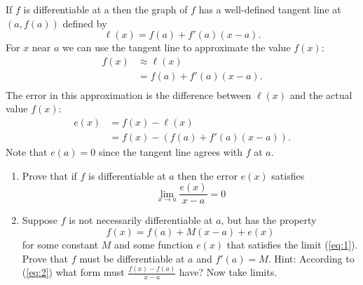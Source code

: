 \documentclass[12pt,letterpaper]{hmcpset}
\begin{document}
\begin{solution}
\end{solution}
\pagebreak
\begin{problem}[5]
  If $f$ is differentiable at a then the graph of $f$ has a well-defined tangent line at $(a,f(a))$ defined by
  \[ \ell(x) = f(a) + f'(a)(x-a).\]
  For $x$ near $a$ we can use the tangent line to approximate the value $f(x)$:
  \begin{align*}
    f(x) &\approx \ell(x) \\
         &= f(a) + f'(a)(x-a).\\
  \end{align*}
  The error in this approximation is the difference between $\ell(x)$ and the actual value $f(x)$:
  \begin{align*}
    e(x) &= f(x) - \ell(x) \\
         &= f(x) - (f(a) + f'(a)(x-a)).
  \end{align*}
  Note that $e(a) = 0$ since the tangent line agrees with $f$ at $a$.
  \begin{enumerate}[label=(\alph*)]
  \item Prove that if $f$ is differentiable at $a$ then the error $e(x)$ satisfies
    \begin{equation} \label{eq:1}
      \lim_{x\to a} \frac{e(x)}{x - a} = 0
    \end{equation}
  \item Suppose $f$ is not necessarily differentiable at $a$, but has the property
    \begin{equation} \label{eq:2}
      f(x) = f(a) + M(x - a) + e(x)
    \end{equation}
    for some constant $M$ and some function $e(x)$ that satisfies the limit (\ref{eq:1}).
    Prove that $f$ must be differentiable at $a$ and $f'(a) = M$.
    Hint: According to (\ref{eq:2}) what form must $\frac{f(x) - f(a)}{x - a}$ have? Now take limits.
  \end{enumerate}
\end{problem}
\begin{solution}

\end{solution}
\pagebreak
\quad
\newpage
\end{document}
